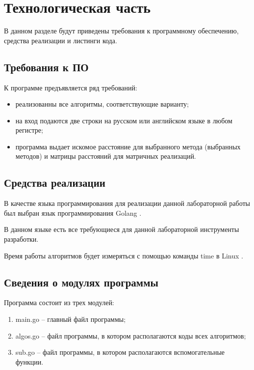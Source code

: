 \chapter{Технологическая часть}

В данном разделе будут приведены требования к программному обеспечению, средства реализации и листинги кода.

\section{Требования к ПО}

К программе предъявляется ряд требований:
\begin{itemize}
	\item реализованны все алгоритмы, соответствующие варианту;
	\item на вход подаются две строки на русском или английском языке в любом регистре;
	\item программа выдает искомое расстояние для выбранного метода (выбранных методов) и матрицы расстояний для матричных реализаций.
\end{itemize}

\section{Средства реализации}

В качестве языка программирования для реализации данной лабораторной работы был выбран язык программирования Golang \cite{pythonlang}. 

В данном языке есть все требующиеся для данной лабораторной инструменты разработки. 

Время работы алгоритмов будет измеряться с помощью команды time в Linux \cite{pythonlangtime}.

\section{Сведения о модулях программы}
Программа состоит из трех модулей:
\begin{enumerate}[label={\arabic*)}]
	\item main.go -- главный файл программы;
	\item algos.go -- файл программы, в котором располагаются коды всех алгоритмов;
	\item sub.go -- файл программы, в котором располагаются вспомогательные функции.
\end{enumerate}


